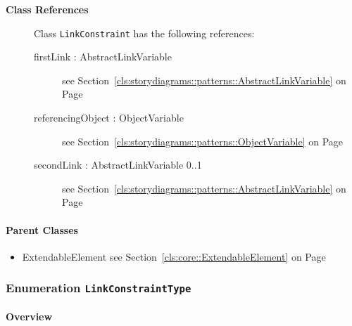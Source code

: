 \begin{description}
	\item[\textbf{Class References}] Class \texttt{LinkConstraint} has the following references:
	\begin{description}
\item[firstLink : AbstractLinkVariable 	]
see Section~\ref{cls:storydiagrams::patterns::AbstractLinkVariable} on Page~\pageref{cls:storydiagrams::patterns::AbstractLinkVariable}
\hspace{\fill}
\nopagebreak


	
\item[referencingObject : ObjectVariable 	]
see Section~\ref{cls:storydiagrams::patterns::ObjectVariable} on Page~\pageref{cls:storydiagrams::patterns::ObjectVariable}
\hspace{\fill}
\nopagebreak


	
\item[secondLink : AbstractLinkVariable 			0..1]
see Section~\ref{cls:storydiagrams::patterns::AbstractLinkVariable} on Page~\pageref{cls:storydiagrams::patterns::AbstractLinkVariable}
\hspace{\fill}
\nopagebreak


	
	\end{description}
	

\end{description}

\paragraph{Parent Classes}
\begin{itemize}
\item ExtendableElement see Section~\ref{cls:core::ExtendableElement} on Page~\pageref{cls:core::ExtendableElement}\end{itemize}
\subsubsection{\Large{Enumeration \bfseries \texttt{LinkConstraintType}\normalfont}}
\label{cls:storydiagrams::patterns::LinkConstraintType} 
\paragraph{Overview}
	
